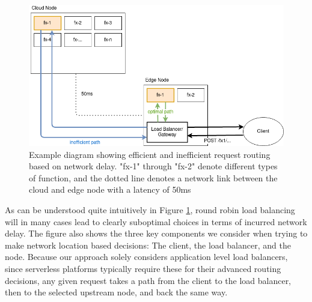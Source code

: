 \documentclass[draft,final]{vutinfth} %
\begin{document}
\begin{figure}
    \centering
    \includegraphics[width=12cm]{graphics/diagrams/efficient_path_example.png}
    \caption{Example diagram showing efficient and inefficient request routing based on network delay. "fx-1" through "fx-2" denote different types of function, and the dotted line denotes a network link between the cloud and edge node with a latency of 50ms}
    \label{fig:efficient_path}
\end{figure}

As can be understood quite intuitively in Figure \ref{fig:efficient_path}, round robin load balancing will in many cases lead to clearly suboptimal choices in terms of incurred network delay. The figure also shows the three key components we consider when trying to make network location based decisions: The client, the load balancer, and the node. Because our approach solely considers application level load balancers, since serverless platforms typically require these for their advanced routing decisions, any given request takes a path from the client to the load balancer, then to the selected upstream node, and back the same way.
\end{document}
